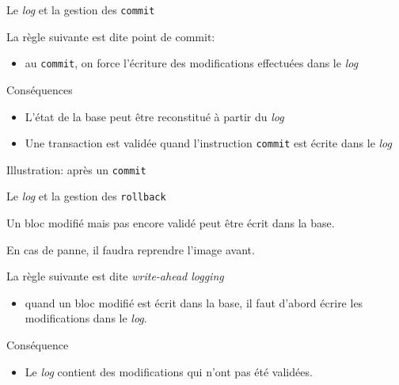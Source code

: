  
\begin{frame}{Le \textit{log} et la gestion des \texttt{commit}}

La règle suivante est dite \alert{point de commit}:

\vfill

\begin{itemize}

  \item au \texttt{commit}, on force l'écriture des modifications effectuées
  dans le \textit{log}
\end{itemize}

\vfill
Conséquences
\vfill

\begin{block}{}
\begin{itemize}
  \item \alert{L'état de la base} peut être reconstitué à partir du \textit{log}
\item Une transaction est validée  quand l'instruction \texttt{commit}  est écrite dans le \textit{log}
\end{itemize}
\end{block}

\end{frame}
 
\begin{frame}{Illustration: après un \texttt{commit}}


\end{frame}
 

 
\begin{frame}{Le \textit{log} et la gestion des \texttt{rollback}}

Un bloc \alert{modifié} mais pas encore \alert{validé} peut être écrit
dans la base. 

\vfill

En cas de panne, il faudra reprendre l'image avant.

\vfill

La règle suivante est dite \textit{write-ahead logging}

\begin{itemize}
  \item quand un bloc modifié est écrit dans la base, il faut \alert{d'abord} 
      écrire les modifications dans le \textit{log}.
\end{itemize}

\vfill
Conséquence
\vfill

\begin{block}{}
\begin{itemize}
  \item Le \textit{log} contient des modifications qui n'ont pas été validées.
\end{itemize}
\end{block}

\end{frame}

